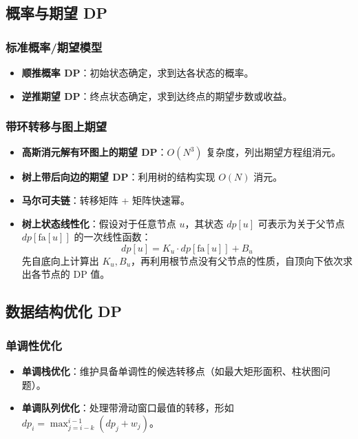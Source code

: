 \subsection{概率与期望 DP}

\subsubsection{标准概率/期望模型}
\begin{itemize}
    \item \textbf{顺推概率 DP}：初始状态确定，求到达各状态的概率。
    \item \textbf{逆推期望 DP}：终点状态确定，求到达终点的期望步数或收益。
\end{itemize}

\subsubsection{带环转移与图上期望}
\begin{itemize}
    \item \textbf{高斯消元解有环图上的期望 DP}：$O(N^3)$ 复杂度，列出期望方程组消元。
    \item \textbf{树上带后向边的期望 DP}：利用树的结构实现 $O(N)$ 消元。
    \item \textbf{马尔可夫链}：转移矩阵 + 矩阵快速幂。
    \item \textbf{树上状态线性化}：假设对于任意节点 $u$，其状态 $dp[u]$ 可表示为关于父节点 $dp[\mathrm{fa}[u]]$ 的一次线性函数：
    \[ dp[u] = K_u \cdot dp[\mathrm{fa}[u]] + B_u \]
    先自底向上计算出 $K_u, B_u$，再利用根节点没有父节点的性质，自顶向下依次求出各节点的 DP 值。
\end{itemize}


\subsection{数据结构优化 DP}

\subsubsection{单调性优化}
\begin{itemize}
    \item \textbf{单调栈优化}：维护具备单调性的候选转移点（如最大矩形面积、柱状图问题）。
    \item \textbf{单调队列优化}：处理带滑动窗口最值的转移，形如 $dp_i = \max_{j=i-k}^{i-1} (dp_j + w_j)$。
\end{itemize}


